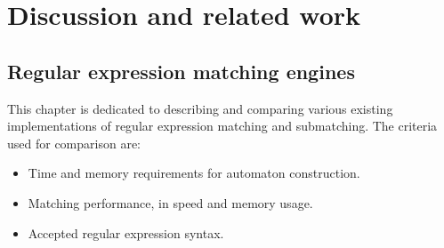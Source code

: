 \chapter{Discussion and related work}
\label{discussion}

\section{Regular expression matching engines}

This chapter is dedicated to describing and comparing various existing
implementations of regular expression matching and submatching. The criteria
used for comparison are:

\begin{itemize}
   \item Time and memory requirements for automaton construction.
   \item Matching performance, in speed and memory usage.
   \item Accepted regular expression syntax.
\end{itemize}





